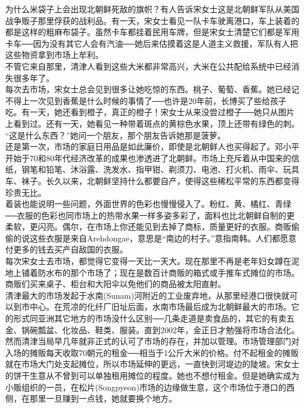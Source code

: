 为什么米袋子上会出现北朝鲜死敌的旗帜？有人告诉宋女士这是北朝鲜军队从美国战争贩子那里俘获的战利品。有一天，宋女士看见一队卡车驶离港口，车上装着的都是这样的粗麻布袋子。虽然卡车都挂着民用车牌，但是宋女士清楚它们都是军用卡车──因为没有其它人会有汽油──她后来估摸着这是人道主义救援，军队有人把这些物资拿到市场上牟利。\\

不管它来自那里，清津人看到这些大米都非常高兴，大米在公共配给系统中已经消失很多年了。\\

每次去市场，宋女士总会见到很多让她吃惊的东西。桃子、葡萄、香蕉。她已经记不得上一次见到香蕉是什么时候的事情了──也许是20年前，长博买了些给孩子吃。有一天，她还看到橙子，真正的橙子！宋女士从来没尝过橙子──她只从图片上看到过。还有一天，她看见一种带着斑点的黄棕色水果，顶上还带有绿色的刺。\\

“这是什么东西？”她问一个朋友，那个朋友告诉她那是菠萝。\\

还是第一次，市场的家庭日用品是如此廉价，即使是北朝鲜人也买得起了。邓小平开始于70和80年代经济改革的成果也渗透进了北朝鲜。市场上充斥着从中国来的信纸，钢笔和铅笔、沐浴露、洗发水、指甲钳、剃须刀、电池、打火机、雨伞、玩具车、袜子。长久以来，北朝鲜坚持什么都要自产，使得这些稀松平常的东西都变得珍贵无比。\\

着装也能说明一些问题，外面世界的色彩也慢慢侵入了。粉红、黄、橘红、青绿──衣服的色彩也同市场上的热带水果一样多姿多彩了，面料也比北朝鲜自制的更柔软，更闪亮。偶尔，在市场上你还能见到去掉了商标，质量更好的衣服。商贩偷偷的说这些衣服是来自Arehdongae，意思是“南边的村子。”意指南韩。人们都愿意付更多的钱去买产自敌国的衣服。\\

每次宋女士去市场，都觉得它变得一天比一天大。现在那里不再是老年妇女蹲在泥地上铺着防水布的那个市场了；现在是数百计商贩的箱式或手推车式摊位的市场。商贩们买来桌子、柜台和大阳伞以免他们的商品被太阳直射。\\

清津最大的市场发起于水南(Sunam)河附近的工业废弃地，从那里经港口很快就可以到市中心。在荒凉的化纤厂旧址后面，水南市场最后成为北朝鲜最大的市场。它的形式同亚洲其它地方的市场没什么区别──几条走道是卖食品的，其它的有卖五金、锅碗瓢盆、化妆品、鞋类、服装。直到2002年，金正日才勉强将市场合法化。然而清津当局早几年就非正式的认可了市场的存在，并加以管理。市场管理部门对入场的摊贩每天收取70朝元的租金──相当于1公斤大米的价格。付不起租金的摊贩就在市场大门处支起摊位，所以市场延伸的更远，一直快到河堤边的陡坡。宋女士的饼干生意从不曾到可以单独租用摊位的程度。她也不想付租金。但是她确实成为小贩组织的一员，在松片(Songpyeon)市场的边缘做生意，这个市场位于港口的西侧，在那里一旦赚到一点钱，她就要换个地方。\\

